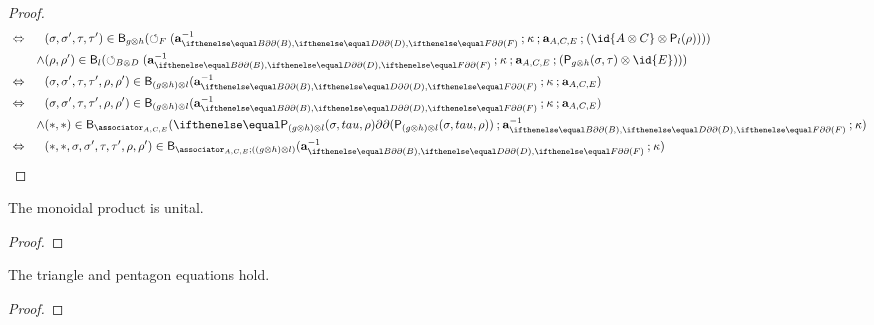 \begin{proof}
\begin{align*}
&\iff&& (\sigma,\sigma',\tau,\tau') \in \best{g \tensor h}(\fbk[F] (\aassociator^{-1}_{\delay[B],\delay[D],\delay[F]} \dcomp \kappa \dcomp \aassociator_{A,C,E} \dcomp (\id{A \tensor C} \tensor \play{l}(\rho))))\\
&&\land& (\rho,\rho') \in \best{l}(\fbk[B \tensor D](\aassociator^{-1}_{\delay[B],\delay[D],\delay[F]} \dcomp \kappa \dcomp \aassociator_{A,C,E} \dcomp (\play{g \tensor h}(\sigma,\tau) \tensor \id{E}))) \\
&\iff&& (\sigma,\sigma',\tau,\tau',\rho,\rho') \in \best{(g \tensor h) \tensor l}(\aassociator^{-1}_{\delay[B],\delay[D],\delay[F]} \dcomp \kappa \dcomp \aassociator_{A,C,E})\\
&\iff&& (\sigma,\sigma',\tau,\tau',\rho,\rho') \in \best{(g \tensor h) \tensor l}(\aassociator^{-1}_{\delay[B],\delay[D],\delay[F]} \dcomp \kappa \dcomp \aassociator_{A,C,E})\\
&&\land& (\ast,\ast) \in \best{\associator_{A,C,E}}(\delay[\play{(g \tensor h) \tensor l}(\sigma,tau,\rho)] \dcomp \aassociator^{-1}_{\delay[B],\delay[D],\delay[F]} \dcomp \kappa)\\
&\iff&& (\ast,\ast,\sigma,\sigma',\tau,\tau',\rho,\rho') \in \best{\associator_{A,C,E} \dcomp ((g \tensor h) \tensor l)}(\aassociator^{-1}_{\delay[B],\delay[D],\delay[F]} \dcomp \kappa)
\end{align*}

\end{proof}

\begin{lemma}
  The monoidal product is unital.
\end{lemma}
\begin{proof}
\end{proof}

\begin{lemma}
  The triangle and pentagon equations hold.
\end{lemma}
\begin{proof}
\end{proof}
